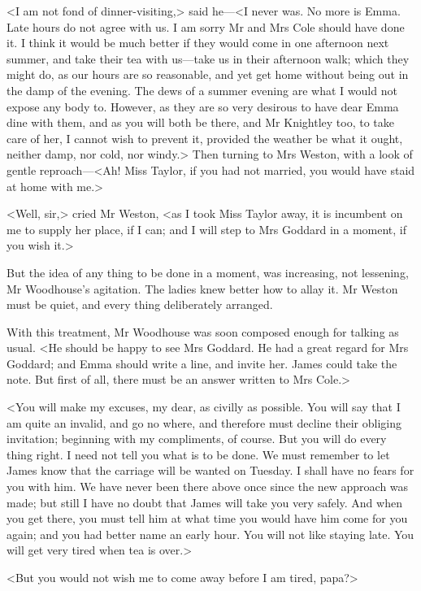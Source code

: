 <I am not fond of dinner-visiting,> said he—<I never was. No more is Emma. Late hours do not agree with us. I am sorry Mr and Mrs Cole should have done it. I think it would be much better if they would come in one afternoon next summer, and take their tea with us—take us in their afternoon walk; which they might do, as our hours are so reasonable, and yet get home without being out in the damp of the evening. The dews of a summer evening are what I would not expose any body to. However, as they are so very desirous to have dear Emma dine with them, and as you will both be there, and Mr Knightley too, to take care of her, I cannot wish to prevent it, provided the weather be what it ought, neither damp, nor cold, nor windy.> Then turning to Mrs Weston, with a look of gentle reproach—<Ah! Miss Taylor, if you had not married, you would have staid at home with me.>

<Well, sir,> cried Mr Weston, <as I took Miss Taylor away, it is incumbent on me to supply her place, if I can; and I will step to Mrs Goddard in a moment, if you wish it.>

But the idea of any thing to be done in a moment, was increasing, not lessening, Mr Woodhouse's agitation. The ladies knew better how to allay it. Mr Weston must be quiet, and every thing deliberately arranged.

With this treatment, Mr Woodhouse was soon composed enough for talking as usual. <He should be happy to see Mrs Goddard. He had a great regard for Mrs Goddard; and Emma should write a line, and invite her. James could take the note. But first of all, there must be an answer written to Mrs Cole.>

<You will make my excuses, my dear, as civilly as possible. You will say that I am quite an invalid, and go no where, and therefore must decline their obliging invitation; beginning with my compliments, of course. But you will do every thing right. I need not tell you what is to be done. We must remember to let James know that the carriage will be wanted on Tuesday. I shall have no fears for you with him. We have never been there above once since the new approach was made; but still I have no doubt that James will take you very safely. And when you get there, you must tell him at what time you would have him come for you again; and you had better name an early hour. You will not like staying late. You will get very tired when tea is over.>

<But you would not wish me to come away before I am tired, papa?>

